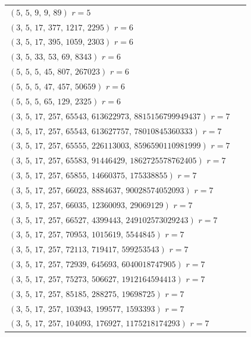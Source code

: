 \documentclass[11pt]{article}
\theoremstyle{definition}
\theoremstyle{remark}
\begin{document}
\begin{longtable}{@{}p{0.95\linewidth}@{}}
\quad $(5,\,5,\,9,\,9,\,89)$ \hfill {\small $r = 5$} \\
\quad $(3,\,5,\,17,\,377,\,1217,\,2295)$ \hfill {\small $r = 6$} \\
\quad $(3,\,5,\,17,\,395,\,1059,\,2303)$ \hfill {\small $r = 6$} \\
\quad $(3,\,5,\,33,\,53,\,69,\,8343)$ \hfill {\small $r = 6$} \\
\quad $(5,\,5,\,5,\,45,\,807,\,267023)$ \hfill {\small $r = 6$} \\
\quad $(5,\,5,\,5,\,47,\,457,\,50659)$ \hfill {\small $r = 6$} \\
\quad $(5,\,5,\,5,\,65,\,129,\,2325)$ \hfill {\small $r = 6$} \\
\quad $(3,\,5,\,17,\,257,\,65543,\,613622973,\,8815156799949437)$ \hfill {\small $r = 7$} \\
\quad $(3,\,5,\,17,\,257,\,65543,\,613627757,\,78010845360333)$ \hfill {\small $r = 7$} \\
\quad $(3,\,5,\,17,\,257,\,65555,\,226113003,\,8596590110981999)$ \hfill {\small $r = 7$} \\
\quad $(3,\,5,\,17,\,257,\,65583,\,91446429,\,1862725578762405)$ \hfill {\small $r = 7$} \\
\quad $(3,\,5,\,17,\,257,\,65855,\,14660375,\,175338855)$ \hfill {\small $r = 7$} \\
\quad $(3,\,5,\,17,\,257,\,66023,\,8884637,\,90028574052093)$ \hfill {\small $r = 7$} \\
\quad $(3,\,5,\,17,\,257,\,66035,\,12360093,\,29069129)$ \hfill {\small $r = 7$} \\
\quad $(3,\,5,\,17,\,257,\,66527,\,4399443,\,249102573029243)$ \hfill {\small $r = 7$} \\
\quad $(3,\,5,\,17,\,257,\,70953,\,1015619,\,5544845)$ \hfill {\small $r = 7$} \\
\quad $(3,\,5,\,17,\,257,\,72113,\,719417,\,599253543)$ \hfill {\small $r = 7$} \\
\quad $(3,\,5,\,17,\,257,\,72939,\,645693,\,6040018747905)$ \hfill {\small $r = 7$} \\
\quad $(3,\,5,\,17,\,257,\,75273,\,506627,\,1912164594413)$ \hfill {\small $r = 7$} \\
\quad $(3,\,5,\,17,\,257,\,85185,\,288275,\,19698725)$ \hfill {\small $r = 7$} \\
\quad $(3,\,5,\,17,\,257,\,103943,\,199577,\,1593393)$ \hfill {\small $r = 7$} \\
\quad $(3,\,5,\,17,\,257,\,104093,\,176927,\,1175218174293)$ \hfill {\small $r = 7$} \\

\end{longtable}
\end{document}
